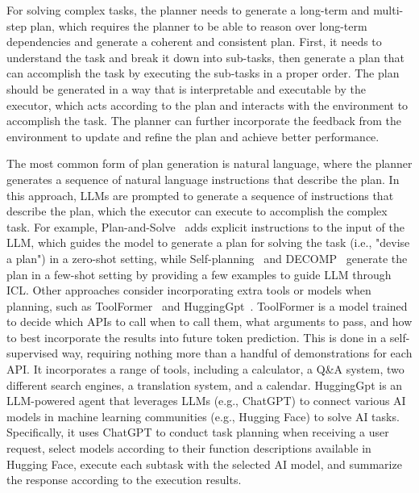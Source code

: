 For solving complex tasks, the planner needs to generate a long-term and multi-step plan, which requires the planner to be able to reason over long-term dependencies and generate a coherent and consistent plan.
First, it needs to understand the task and break it down into sub-tasks, then generate a plan that can accomplish the task by executing the sub-tasks in a proper order.
The plan should be generated in a way that is interpretable and executable by the executor, which acts according to the plan and interacts with the environment to accomplish the task.
The planner can further incorporate the feedback from the environment to update and refine the plan and achieve better performance.

The most common form of plan generation is natural language, where the planner generates a sequence of natural language instructions that describe the plan.
In this approach, LLMs are prompted to generate a sequence of instructions that describe the plan, which the executor can execute to accomplish the complex task.
For example, Plan-and-Solve~\cite{wang2023plan} adds explicit instructions to the input of the LLM, which guides the model to generate a plan for solving the task (i.e., "devise a plan") in a zero-shot setting, while Self-planning~\cite{jiang2024selfplanning} and DECOMP~\cite{khot2022decomposed} generate the plan in a few-shot setting by providing a few examples to guide LLM through ICL\@.
Other approaches consider incorporating extra tools or models when planning, such as ToolFormer~\cite{schick2023toolformer} and HuggingGpt~\cite{shen2023hugginggpt}.
ToolFormer is a model trained to decide which APIs to call when to call them, what arguments to pass, and how to best incorporate the results into future token prediction.
This is done in a self-supervised way, requiring nothing more than a handful of demonstrations for each API. It incorporates a range of tools, including a calculator, a Q\&A system, two different search engines, a translation system, and a calendar.
HuggingGpt is an LLM-powered agent that leverages LLMs (e.g., ChatGPT) to connect various AI models in machine learning communities (e.g., Hugging Face) to solve AI tasks.
Specifically, it uses ChatGPT to conduct task planning when receiving a user request, select models according to their function descriptions available in Hugging Face, execute each subtask with the selected AI model, and summarize the response according to the execution results.

